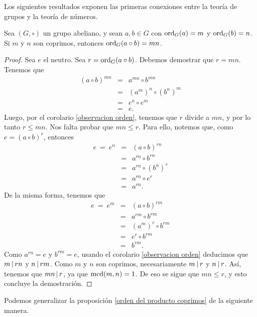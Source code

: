 Los siguientes resultados exponen las primeras conexiones entre la teoría de grupos y la teoría de números.

\begin{prop}\label{orden del producto coprimos}
	Sea $(G,\circ)$ un grupo abeliano, y sean $a,b\in G$ con $\mathrm{ord}_{G}(a)=m$ y $\mathrm{ord}_{G}(b)=n$. Si $m$ y $n$ son coprimos, entonces $\mathrm{ord}_{G}(a\circ b)=mn$.
\end{prop}

\begin{proof}
	Sea $e$ el neutro. Sea $r=\mathrm{ord}_{G}(a\circ b)$. Debemos demostrar que $r = mn$. Tenemos que 
	\begin{eqnarray*}
		(a\circ b)^{mn} &=& a^{mn}\circ b^{mn}\\
                &=& (a^m)^n\circ (b^n)^m\\
		&=&e^n\circ e^m \\
		 &=&  e.
	\end{eqnarray*}
Luego, por el corolario \ref{observacion orden}, tenemos que $r$ divide a $mn$, y por lo tanto $r\leq mn$. Nos falta probar que $mn\leq r$. Para ello, notemos que, como $e = (a\circ b)^r$, entonces
\begin{eqnarray*}
	 e \ = \ e^n & =&  (a\circ b)^{rn} \\
	 & = & a^{rn} \circ b^{rn}\\
	 & = & a^{rn} \circ (b^{n})^{r}\\
	 & = & a^{rn} \circ e^{r}\\
	 &=& a^{rn}.
\end{eqnarray*}
 De la misma forma, tenemos que
\begin{eqnarray*}
	 e \ = \ e^m & =&  (a\circ b)^{rm} \\
	 & = & a^{rm} \circ b^{rm}\\
	 & = & (a^{m})^r \circ b^{rm}\\
	 & = & e^{r} \circ b^{rm}\\
	 &=& b^{rm}.
\end{eqnarray*}
Como $a^{rn}=e$ y $b^{rm} = e$, usando el corolario \ref{observacion orden} deducimos que $m \hspace{1.8pt}|\hspace{1.8pt} rn$ y $n\hspace{1.8pt}|\hspace{1.8pt} rm$. Como $m$ y $n$ son coprimos, necesariamente $m \hspace{1.8pt}|\hspace{1.8pt} r$ y $n\hspace{1.8pt}|\hspace{1.8pt} r$. Así, tenemos que $mn\hspace{1.8pt}|\hspace{1.8pt} r$, ya que ${\rm mcd}(m,n)=1$. De eso se sigue que $mn \leq r$, y esto concluye la demostración. 
\end{proof}

Podemos generalizar la proposición \ref{orden del producto coprimos} de la siguiente manera. 

